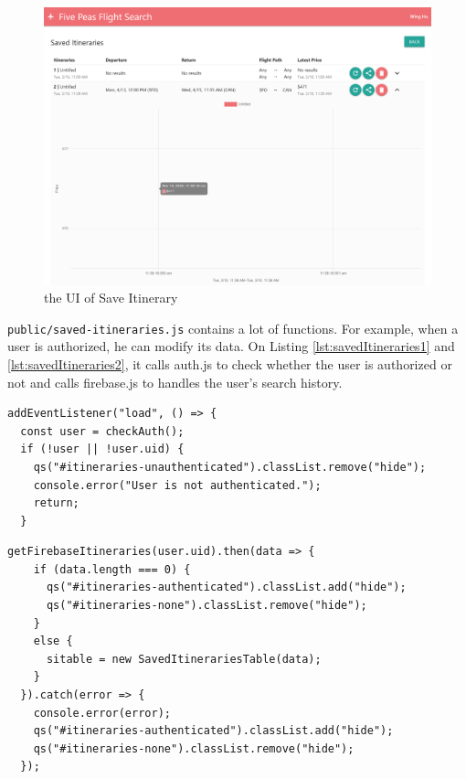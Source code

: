 \documentclass[12pt, a4paper]{article}
\newcommand{\code}[1]{\texttt{#1}}
\begin{document}
\begin{figure}[ht]
\centering
\includegraphics[width=\textwidth, frame]{save_itineraries2.png}
\caption{the UI of Save Itinerary}
\label{fig:save_itineraries2}
\end{figure}

\code{public/saved-itineraries.js} contains a lot of functions. For example, when a user is authorized, he can modify its data. On Listing \ref{lst:savedItineraries1} and \ref{lst:savedItineraries2}, it calls auth.js to check whether the user is authorized or not and calls firebase.js to handles the user's search history.

\begin{lstlisting}[frame=tb, caption=checks if user is authenticated with a call , label=lst:savedItineraries1]
addEventListener("load", () => {
  const user = checkAuth();
  if (!user || !user.uid) {
    qs("#itineraries-unauthenticated").classList.remove("hide");
    console.error("User is not authenticated.");
    return;
  }
\end{lstlisting}

\begin{lstlisting}[frame=tb, caption=Pulls user’s saved itineraries using call to firebase.js, label=lst:savedItineraries2]
getFirebaseItineraries(user.uid).then(data => {
    if (data.length === 0) {
      qs("#itineraries-authenticated").classList.add("hide");
      qs("#itineraries-none").classList.remove("hide");
    }
    else {
      sitable = new SavedItinerariesTable(data);
    }
  }).catch(error => {
    console.error(error);
    qs("#itineraries-authenticated").classList.add("hide");
    qs("#itineraries-none").classList.remove("hide");
  });
\end{lstlisting}
\end{document}
